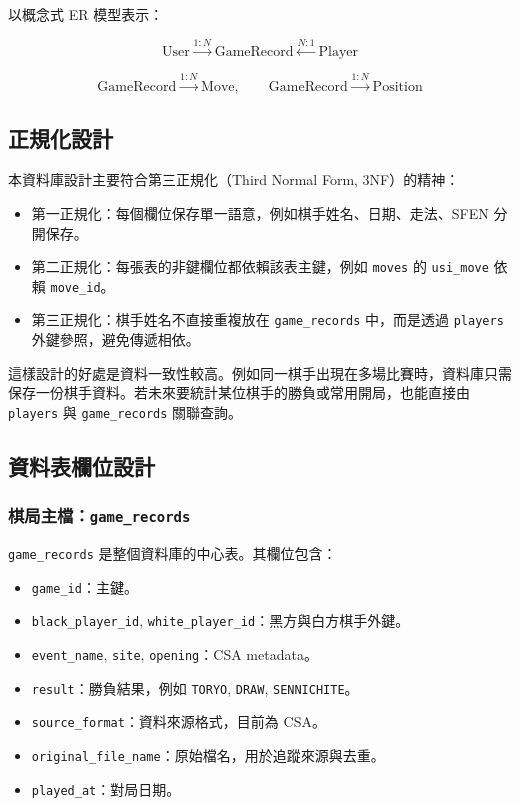 \documentclass[12pt,a4paper,fontset=none]{ctexart}
\begin{document}
以概念式 ER 模型表示：

\[
\text{User}
\xrightarrow{1:N}
\text{GameRecord}
\xleftarrow{N:1}
\text{Player}
\]

\[
\text{GameRecord}
\xrightarrow{1:N}
\text{Move},
\qquad
\text{GameRecord}
\xrightarrow{1:N}
\text{Position}
\]

\subsection{正規化設計}
本資料庫設計主要符合第三正規化（Third Normal Form, 3NF）的精神：

\begin{itemize}
  \item 第一正規化：每個欄位保存單一語意，例如棋手姓名、日期、走法、SFEN 分開保存。
  \item 第二正規化：每張表的非鍵欄位都依賴該表主鍵，例如 \texttt{moves} 的 \texttt{usi\_move} 依賴 \texttt{move\_id}。
  \item 第三正規化：棋手姓名不直接重複放在 \texttt{game\_records} 中，而是透過 \texttt{players} 外鍵參照，避免傳遞相依。
\end{itemize}

這樣設計的好處是資料一致性較高。例如同一棋手出現在多場比賽時，資料庫只需保存一份棋手資料。若未來要統計某位棋手的勝負或常用開局，也能直接由 \texttt{players} 與 \texttt{game\_records} 關聯查詢。

\subsection{資料表欄位設計}

\subsubsection{棋局主檔：\texttt{game\_records}}
\texttt{game\_records} 是整個資料庫的中心表。其欄位包含：

\begin{itemize}
  \item \texttt{game\_id}：主鍵。
  \item \texttt{black\_player\_id}, \texttt{white\_player\_id}：黑方與白方棋手外鍵。
  \item \texttt{event\_name}, \texttt{site}, \texttt{opening}：CSA metadata。
  \item \texttt{result}：勝負結果，例如 \texttt{TORYO}, \texttt{DRAW}, \texttt{SENNICHITE}。
  \item \texttt{source\_format}：資料來源格式，目前為 CSA。
  \item \texttt{original\_file\_name}：原始檔名，用於追蹤來源與去重。
  \item \texttt{played\_at}：對局日期。
\end{itemize}
\end{document}
